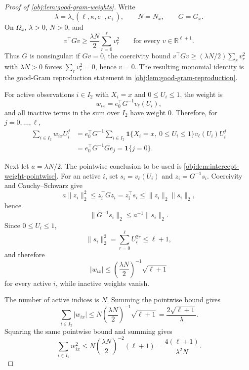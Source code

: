 \documentclass[11pt]{article}
\begin{document}
\begin{proof}[Proof of \cref{obj:lem:good-gram-weights}]
Write
\[
        \lambda=\lambda_\star(\ell,\kappa,c_-,c_+),
        \qquad
        N=N_x,
        \qquad
        G=G_x .
\]
On \(\Omega_x\), \(\lambda>0\), \(N>0\), and
\[
        v^\top Gv\ge \frac{\lambda N}{2}\sum_{r=0}^{\ell}v_r^2
        \qquad\text{for every }v\in\mathbb R^{\ell+1}.
\]
Thus \(G\) is nonsingular: if \(Gv=0\), the coercivity bound \(v^\top Gv\ge(\lambda N/2)\sum_r v_r^2\) with \(\lambda N>0\) forces \(\sum_r v_r^2=0\), hence \(v=0\).  The resulting monomial identity is the good-Gram reproduction statement in \cref{obj:lem:good-gram-reproduction}. %

For active observations \(i\in I_2\) with \(X_i=x\) and \(0\le U_i\le1\), the weight is
\[
        w_{ix}=e_0^\top G^{-1}v_\ell(U_i),
\]
and all inactive terms in the sum over \(I_2\) have weight \(0\).  Therefore, for \(j=0,\ldots,\ell\),
\[
\begin{aligned}
\sum_{i\in I_2} w_{ix}U_i^j
&=
e_0^\top G^{-1}
\sum_{i\in I_2}
\mathbf 1\{X_i=x,\ 0\le U_i\le1\}v_\ell(U_i)U_i^j  \\
&=
e_0^\top G^{-1}G e_j
=
\mathbf 1\{j=0\}.
\end{aligned}
\]

Next let \(a=\lambda N/2\).  The pointwise conclusion to be used is \cref{obj:lem:intercept-weight-pointwise}.  For an active \(i\), set \(s_i=v_\ell(U_i)\) and \(z_i=G^{-1}s_i\).  Coercivity and Cauchy--Schwarz give
\[
        a\|z_i\|_2^2
        \le z_i^\top Gz_i
        = z_i^\top s_i
        \le \|z_i\|_2\|s_i\|_2,
\]
hence
\[
        \|G^{-1}s_i\|_2\le a^{-1}\|s_i\|_2 .
\]
Since \(0\le U_i\le1\),
\[
        \|s_i\|_2^2=\sum_{r=0}^{\ell}U_i^{2r}\le \ell+1,
\]
and therefore
\[
        |w_{ix}|
        \le
        \left(\frac{\lambda N}{2}\right)^{-1}\sqrt{\ell+1}
\]
for every active \(i\), while inactive weights vanish. %

The number of active indices is \(N\).  Summing the pointwise bound gives
\[
        \sum_{i\in I_2}|w_{ix}|
        \le
        N\left(\frac{\lambda N}{2}\right)^{-1}\sqrt{\ell+1}
        =
        \frac{2\sqrt{\ell+1}}{\lambda}.
\]
Squaring the same pointwise bound and summing gives
\[
        \sum_{i\in I_2}w_{ix}^2
        \le
        N\left(\frac{\lambda N}{2}\right)^{-2}(\ell+1)
        =
        \frac{4(\ell+1)}{\lambda^2N}.
\]
\end{proof}
\end{document}
